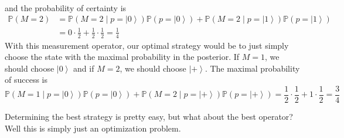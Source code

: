\documentclass{article}
\newcommand{\ket}[1]{\ensuremath{\left|#1\right\rangle}}
\begin{document}
\begin{example}
\begin{align}
      \end{align}
      and the probability of certainty is 
      \begin{align}
        \mathbb{P}(M = 2) & = \mathbb{P}(M = 2 \mid p = \ket{0}) \mathbb{P}(p = \ket{0}) + \mathbb{P}(M = 2 \mid p = \ket{1}) \mathbb{P}(p = \ket{1}) \\
                          & = 0 \cdot \frac{1}{2} + \frac{1}{2} \cdot \frac{1}{2} = \frac{1}{4}
      \end{align}
      With this measurement operator, our optimal strategy would be to just simply choose the state with the maximal probability in the posterior. If $M = 1$, we should choose $\ket{0}$ and if $M = 2$, we should choose $\ket{+}$. The maximal probability of success is 
      \begin{equation}
        \mathbb{P}(M = 1 \mid p = \ket{0}) \mathbb{P}(p = \ket{0}) + \mathbb{P}(M = 2 \mid p = \ket{+}) \mathbb{P}(p = \ket{+}) = \frac{1}{2} \cdot \frac{1}{2} + 1 \cdot \frac{1}{2} = \frac{3}{4}
      \end{equation}
    \end{example}

    Determining the best strategy is pretty easy, but what about the best operator? Well this is simply just an optimization problem. 
\end{document}
